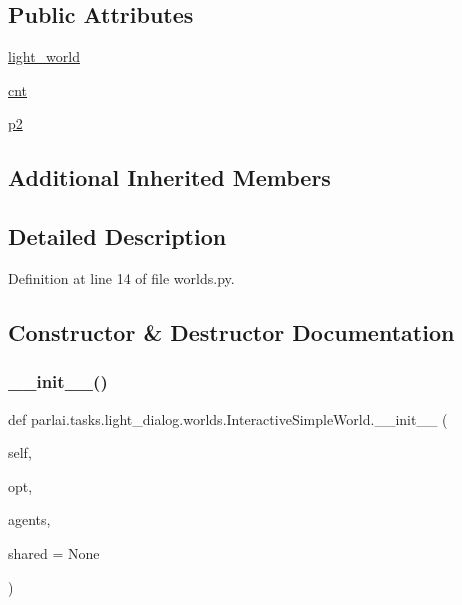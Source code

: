 \subsection*{Public Attributes}
\begin{DoxyCompactItemize}
\item 
\hyperlink{classparlai_1_1tasks_1_1light__dialog_1_1worlds_1_1InteractiveSimpleWorld_ac921ca4e82abbe89d74bac1647c81709}{light\+\_\+world}
\item 
\hyperlink{classparlai_1_1tasks_1_1light__dialog_1_1worlds_1_1InteractiveSimpleWorld_a5d42d18cbe9f2e6d632b4d1f9419ab1e}{cnt}
\item 
\hyperlink{classparlai_1_1tasks_1_1light__dialog_1_1worlds_1_1InteractiveSimpleWorld_a3eff26ccc2fcf05aefd085fcc32337d8}{p2}
\end{DoxyCompactItemize}
\subsection*{Additional Inherited Members}


\subsection{Detailed Description}


Definition at line 14 of file worlds.\+py.



\subsection{Constructor \& Destructor Documentation}
\mbox{\label{classparlai_1_1tasks_1_1light__dialog_1_1worlds_1_1InteractiveSimpleWorld_a4fdcb579f2f36ccbfc11118ce857b2e4}} 
\subsubsection{\texorpdfstring{\+\_\+\+\_\+init\+\_\+\+\_\+()}{\_\_init\_\_()}}
{\footnotesize\ttfamily def parlai.\+tasks.\+light\+\_\+dialog.\+worlds.\+Interactive\+Simple\+World.\+\_\+\+\_\+init\+\_\+\+\_\+ (\begin{DoxyParamCaption}\item[{}]{self,  }\item[{}]{opt,  }\item[{}]{agents,  }\item[{}]{shared = {\ttfamily None} }\end{DoxyParamCaption})}



